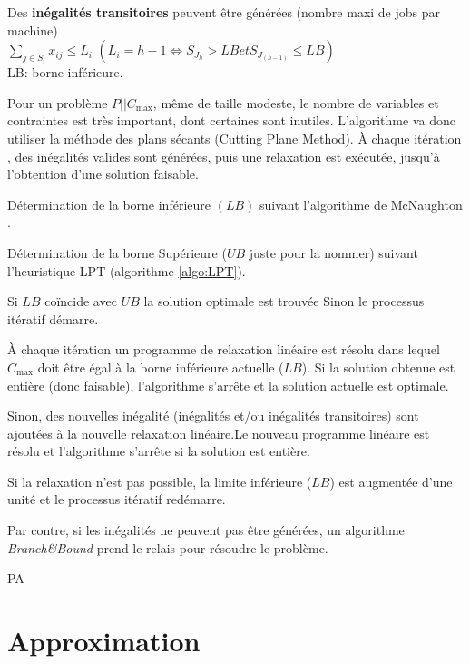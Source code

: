 \documentclass[a4paper,12pt]{report}
\theoremstyle{plain}				%
\theoremstyle{definition}				%
\newcommand\problemGrahamP{$P||C_{\max}$\xspace}
\begin{document}
\bigskip
Des \textbf{inégalités transitoires} peuvent être générées (nombre maxi de jobs par machine) \\
$\sum_{j \in S_i} x_{ij} \leq L_i$ \quad $(L_i = h-1 \iff S_{J_h} > LB et S_{J_{(h-1)}} \leq LB)$\\
LB: borne inférieure.

\bigskip

Pour un problème \problemGrahamP, même de taille modeste, le nombre de
variables et contraintes est très important, dont certaines sont
inutiles.
L'algorithme va donc utiliser la méthode des plans sécants (Cutting
Plane Method).
\`A chaque itération , des inégalités valides sont générées, puis une
relaxation est exécutée, jusqu'à l'obtention d'une solution faisable.

\bigskip
\begin{algorithm}[H]
\DontPrintSemicolon

Détermination de la borne inférieure $(LB)$ suivant l'algorithme de
McNaughton \cite{mcnaughton1959scheduling}.

\BlankLine %
Détermination de la borne Supérieure ($UB$ juste pour la nommer)
suivant l'heuristique LPT (algorithme \ref{algo:LPT}).

\BlankLine %
Si $LB$ coïncide avec $UB$ la solution optimale est trouvée Sinon le
processus itératif démarre.

\BlankLine
À chaque itération un programme de relaxation linéaire est résolu dans
lequel $C_{\max}$ doit être égal à la borne inférieure actuelle
($LB$).
Si la solution obtenue est entière (donc faisable), l'algorithme
s'arrête et la solution actuelle est optimale.

\BlankLine
Sinon, des nouvelles inégalité (inégalités et/ou inégalités
transitoires) sont ajoutées à la nouvelle relaxation linéaire.Le
nouveau programme linéaire est résolu et l'algorithme s'arrête si la
solution est entière.

\BlankLine
Si la relaxation n'est pas possible, la limite inférieure ($LB$) est
augmentée d'une unité et le processus itératif redémarre.

\BlankLine
Par contre, si les inégalités ne peuvent pas être générées, un
algorithme \emph{Branch\&Bound} prend le relais pour résoudre le
problème.

\caption{PA\label{algo:PA}}
\end{algorithm}


\section{Approximation}
\end{document}
